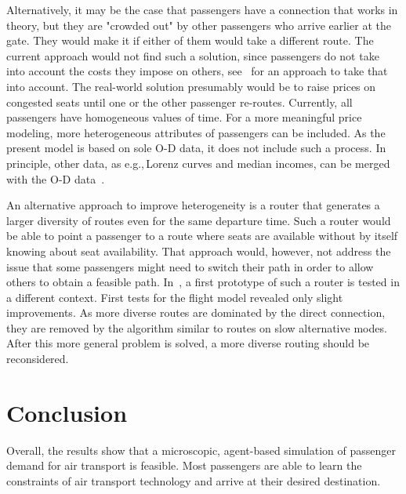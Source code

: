 Alternatively, it may be the case that passengers have a connection that works in theory, but they are "crowded out" by other passengers who arrive earlier at the gate.  
They would make it if either of them would take a different route.  
The current approach would not find such a solution, since passengers do not take into account the costs they impose on others, see~\citet{LaemmelFloetteroed2009KISysOptEvac} for an approach to take that into account.  
The real-world solution presumably would be to raise prices on congested seats until one or the other passenger re-routes. 
Currently, all passengers have homogeneous values of time.   
For a more meaningful price modeling, more heterogeneous attributes of passengers can be included. 
As the present model is based on sole O-D data, it does not include such a process. 
In principle, other data, as e.g.,\,Lorenz curves and median incomes, can be merged with the O-D data~\citep{KickhoeferEtAl2011PolicyEvaluationIncome}.  

An alternative approach to improve heterogeneity is a router that generates a larger diversity of routes even for the same departure time.  
Such a router would be able to point a passenger to a route where seats are available without by itself knowing about seat availability.  
That approach would, however, not address the issue that some passengers might need to switch their path in order to allow others to obtain a feasible path. 
In~\citet{Graf2013Da}, a first prototype of such a router is tested in a different context. 
First tests for the flight model revealed only slight improvements. 
As more diverse routes are dominated by the direct connection, they are removed by the algorithm similar to routes on slow alternative modes. 
After this more general problem is solved, a more diverse routing should be reconsidered. 

\section{Conclusion}
Overall, the results show that a microscopic, agent-based simulation of passenger demand for air transport is feasible. 
Most passengers are able to learn the constraints of air transport technology and arrive at their desired destination.

